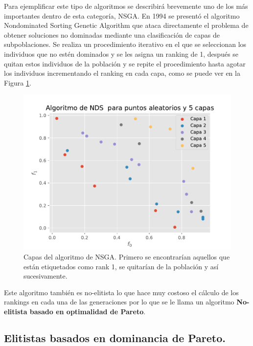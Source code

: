 Para ejemplificar este tipo de algoritmos se describirá brevemente uno de los más importantes dentro de esta categoría, NSGA. En 1994 se presentó el algoritmo Nondominated Sorting Genetic Algorithm \cite{srinivasMuiltiobjectiveOptimizationUsing1994} que ataca directamente el problema de obtener soluciones no dominadas mediante una clasificación de capas de subpoblaciones. Se realiza un procedimiento iterativo en el que se seleccionan los individuos que no estén dominados y se les asigna un ranking de 1, después se quitan estos individuos de la población y se repite el procedimiento hasta agotar los individuos incrementando el ranking en cada capa, como se puede ver en la Figura \ref{fig:nsga1}.

\begin{figure}[H]
    \centering
    \includegraphics[width=\textwidth]{Figuras/nds.pdf}
    \caption[NSGA]{Capas del algoritmo de NSGA. Primero se encontrarían aquellos que están etiquetados como rank 1, se quitarían de la población y así sucesivamente.}
    \label{fig:nsga1}
\end{figure}


Este algoritmo también es no-elitista lo que hace muy costoso el cálculo de los rankings en cada una de las generaciones por lo que se le llama un algoritmo \textbf{No-elitista basado en optimalidad de Pareto}.

\subsection*{Elitistas basados en dominancia de Pareto.} \label{sec:nsga2}


